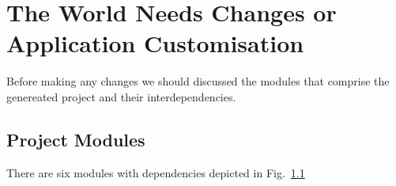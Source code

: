 \chapter{The World Needs Changes or Application Customisation}\label{ch00:03}

  Before making any changes we should discussed the modules that comprise the genereated project and their interdependencies.

\section{Project Modules}
  There are six modules with dependencies depicted in Fig.~\ref{}
